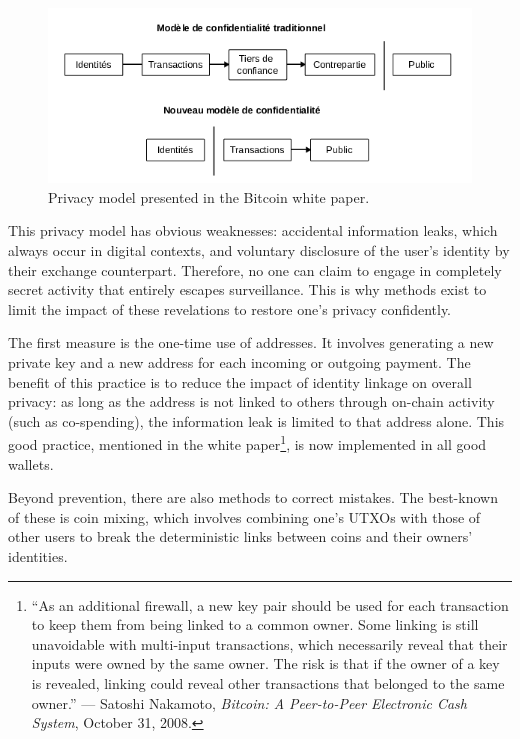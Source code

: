 \documentclass[
  a5paper,
  smalldemyvopaper,10pt,twoside,onecolumn,openright,extrafontsizes,hidelinks]{memoir}
\begin{document}
\begin{figure}[H]

{\centering \includegraphics{chapters/img/white-paper-privacy-model-fr.png}

}

\caption{Privacy model presented in the Bitcoin white paper.}

\end{figure}%

This privacy model has obvious weaknesses: accidental information leaks,
which always occur in digital contexts, and voluntary disclosure of the
user's identity by their exchange counterpart. Therefore, no one can
claim to engage in completely secret activity that entirely escapes
surveillance. This is why methods exist to limit the impact of these
revelations to restore one's privacy confidently.

The first measure is the one-time use of addresses. It involves
generating a new private key and a new address for each incoming or
outgoing payment. The benefit of this practice is to reduce the impact
of identity linkage on overall privacy: as long as the address is not
linked to others through on-chain activity (such as co-spending), the
information leak is limited to that address alone. This good practice,
mentioned in the white paper\footnote{``As an additional firewall, a new
  key pair should be used for each transaction to keep them from being
  linked to a common owner. Some linking is still unavoidable with
  multi-input transactions, which necessarily reveal that their inputs
  were owned by the same owner. The risk is that if the owner of a key
  is revealed, linking could reveal other transactions that belonged to
  the same owner.'' --- Satoshi Nakamoto, \emph{Bitcoin: A Peer-to-Peer
  Electronic Cash System}, October 31, 2008.}, is now implemented in all
good wallets.

Beyond prevention, there are also methods to correct mistakes. The
best-known of these is coin mixing, which involves combining one's UTXOs
with those of other users to break the deterministic links between coins
and their owners' identities.
\end{document}
